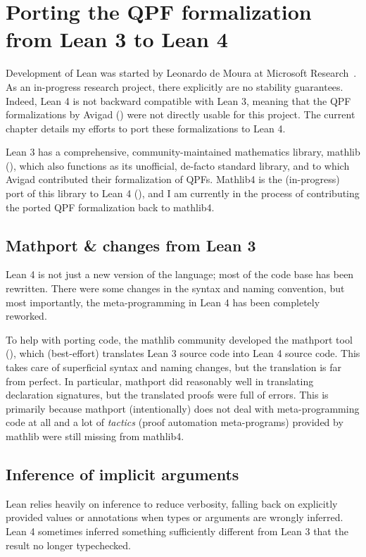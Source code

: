 
\chapter{Porting the QPF formalization from Lean 3 to Lean 4}%
\label{ch:porting}

Development of Lean was started by Leonardo de Moura at Microsoft Research~\cite{demouraLeanTheoremProver2015, avigadTheoremProvingLean}. As an in-progress research project, there explicitly are no stability guarantees. Indeed, Lean 4 is not backward compatible with Lean 3, meaning that the QPF formalizations by Avigad \etal{}
(\cite{avigadDataTypesQuotients2019a}) were not directly usable for this project. The current chapter details my efforts to port these formalizations to Lean 4.



Lean 3 has a comprehensive, community-maintained mathematics library, mathlib (\cite{themathlibcommunityLeanMathematicalLibrary2020}), 
which also functions as its unofficial, de-facto standard library, and to which Avigad \etal{} contributed
their formalization of QPFs.
Mathlib4 is the (in-progress) port of this library to Lean 4 (\cite{mathlib4}),
and I am currently in the process of contributing
the ported QPF formalization back to mathlib4.




\section{Mathport \& changes from Lean 3}
Lean 4 is not just a new version of the language; most of the code base has been rewritten.
There were some changes in the syntax and naming convention, but most importantly, 
the meta-programming in Lean 4 has been completely reworked.

To help with porting code, the mathlib community developed the mathport tool (\cite{mathport}), which 
(best-effort) translates Lean 3 source code into Lean 4 source code. This takes care of superficial 
syntax and naming changes, but the translation is far from perfect.
In particular, mathport did reasonably well in translating declaration signatures, 
but the translated proofs were full of errors.
This is primarily because mathport (intentionally) does not deal with meta-programming code at all and a lot
of \emph{tactics} (proof automation meta-programs) provided by mathlib were still missing from mathlib4.


\section{Inference of implicit arguments}
Lean relies heavily on inference to reduce verbosity, falling back on explicitly provided
values or annotations when types or arguments are wrongly inferred.
Lean 4 sometimes inferred something sufficiently different from Lean 3 that the result no longer
typechecked.



